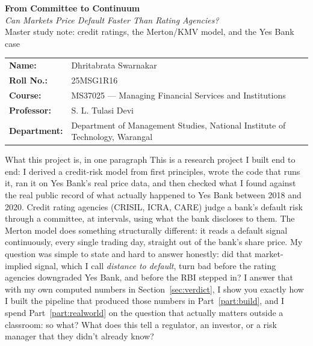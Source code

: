 \documentclass[11pt,a4paper]{article}
\begin{document}
\begin{tcolorbox}[colback=navy,colframe=navy,coltext=white,arc=3pt]
{\Large\bfseries From Committee to Continuum}\\[3pt]
{\large\itshape Can Markets Price Default Faster Than Rating Agencies?}\\[3pt]
Master study note: credit ratings, the Merton/KMV model, and the Yes Bank case
\end{tcolorbox}

\begin{tabularx}{\textwidth}{@{}lX@{}}
\textbf{Name:} & Dhritabrata Swarnakar\\
\textbf{Roll No.:} & 25MSG1R16\\
\textbf{Course:} & MS37025 --- Managing Financial Services and Institutions\\
\textbf{Professor:} & S. L. Tulasi Devi\\
\textbf{Department:} & Department of Management Studies, National Institute of Technology, Warangal\\
\end{tabularx}

\vspace{6pt}
\begin{keybox}{What this project is, in one paragraph}
This is a research project I built end to end: I derived a credit-risk model from first principles, wrote the code that runs it, ran it on Yes Bank's real price data, and then checked what I found against the real public record of what actually happened to Yes Bank between 2018 and 2020. Credit rating agencies (CRISIL, ICRA, CARE) judge a bank's default risk through a committee, at intervals, using what the bank discloses to them. The Merton model does something structurally different: it reads a default signal continuously, every single trading day, straight out of the bank's share price. My question was simple to state and hard to answer honestly: did that market-implied signal, which I call \emph{distance to default}, turn bad before the rating agencies downgraded Yes Bank, and before the RBI stepped in? I answer that with my own computed numbers in Section~\ref{sec:verdict}, I show you exactly how I built the pipeline that produced those numbers in Part~\ref{part:build}, and I spend Part~\ref{part:realworld} on the question that actually matters outside a classroom: so what? What does this tell a regulator, an investor, or a risk manager that they didn't already know?
\end{keybox}
\end{document}
